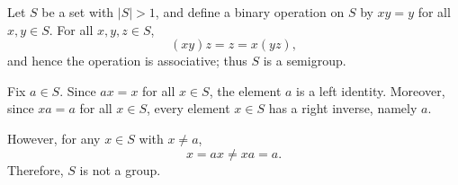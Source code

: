 Let \(S\) be a set with \(\lvert S \rvert > 1\), and define a binary operation on
\(S\) by \(xy = y\) for all \(x,y \in S\).
For all \(x,y,z \in S\),
\[
(xy)z = z = x(yz),
\]
and hence the operation is associative; thus \(S\) is a semigroup.

Fix \(a \in S\).
Since \(ax = x\) for all \(x \in S\), the element \(a\) is a left identity.
Moreover, since \(xa = a\) for all \(x \in S\), every element \(x \in S\) has
a right inverse, namely \(a\).

However, for any \(x \in S\) with \(x \neq a\),
\[
x = ax \neq xa = a.
\]
Therefore, \(S\) is not a group.
